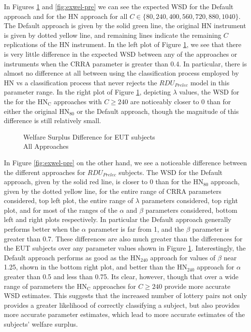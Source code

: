 \documentclass[../main.tex]{subfiles}
\begin{document}
In Figures \ref{fig:exwel-eut} and \ref{fig:exwel-pre} we can see the expected WSD for the Default approach and for the HN approach for all $C \in \lbrace 80, 240, 400, 560, 720, 880, 1040 \rbrace$.
The Default approach is given by the solid green line, the original HN instrument is given by dotted yellow line, and remaining lines indicate the remaining $C$ replications of the HN instrument.
In the left plot of Figure \ref{fig:exwel-eut}, we see that there is very little difference in the expected WSD between any of the approaches or instruments when the CRRA parameter is greater than 0.4.
In particular, there is almost no difference at all between using the classification process employed by HN vs a classification process that never rejects the $\mathit{RDU_{Prelec}}$ model in this parameter range.
In the right plot of Figure \ref{fig:exwel-eut}, depicting $\lambda$ values, the WSD for the for the $\text{HN}_\text{C}$ approaches with $C \geq 240$ are noticeably closer to 0 than for either the original $\text{HN}_{80}$ or the Default approach, though the magnitude of this difference is still relatively small.

\begin{figure}[ht!]
	\center
	\caption{Welfare Surplus Difference for EUT subjects\\All Approaches}
	\label{fig:exwel-eut}
\end{figure}

In Figure \ref{fig:exwel-pre} on the other hand, we see a noticeable difference between the different approaches for $\mathit{RDU_{Prelec}}$ subjects.
The WSD for the Default approach, given by the solid red line, is closer to 0 than for the $\text{HN}_{80}$ approach, given by the dotted yellow line, for the entire range of CRRA parameters considered, top left plot, the entire range of $\lambda$ parameters considered, top right plot, and for most of the ranges of the $\alpha$ and $\beta$ parameters considered, bottom left and right plots respectively.
In particular the Default approach generally performs better when the $\alpha$ parameter is far from 1, and the $\beta$ parameter is greater than 0.7.
These differences are also much greater than the differences for the EUT subjects over any parameter values shown in Figure  \ref{fig:exwel-eut}.
Interestingly, the Default approach performs as good as the $\text{HN}_\text{240}$ approach for values of $\beta$ near 1.25, shown in the bottom right plot, and better than the $\text{HN}_{240}$ approach for $\alpha$ greater than 0.5 and less than 0.75.
Its clear, however, though that over a wide range of parameters the $\text{HN}_\text{C}$ approaches for $C \geq 240$ provide more accurate WSD estimates.
This suggests that the increased number of lottery pairs not only provides a greater likelihood of correctly classifying a subject, but also provides more accurate parameter estimates, which lead to more accurate estimates of the subjects' welfare surplus.
\end{document}
